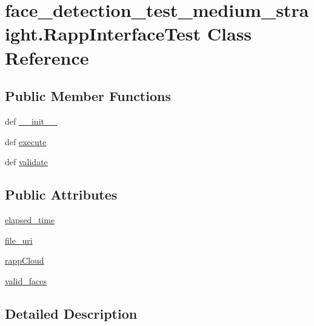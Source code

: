\hypertarget{classface__detection__test__medium__straight_1_1RappInterfaceTest}{\section{face\-\_\-detection\-\_\-test\-\_\-medium\-\_\-straight.\-Rapp\-Interface\-Test Class Reference}
\label{classface__detection__test__medium__straight_1_1RappInterfaceTest}
}
\subsection*{Public Member Functions}
\begin{DoxyCompactItemize}
\item 
def \hyperlink{classface__detection__test__medium__straight_1_1RappInterfaceTest_a1fd50662520a1155d022ab810a361b41}{\-\_\-\-\_\-init\-\_\-\-\_\-}
\item 
def \hyperlink{classface__detection__test__medium__straight_1_1RappInterfaceTest_a0dd7ef95d869635dc9815833be53f02b}{execute}
\item 
def \hyperlink{classface__detection__test__medium__straight_1_1RappInterfaceTest_ab895aebaf53763223674a1f03e357179}{validate}
\end{DoxyCompactItemize}
\subsection*{Public Attributes}
\begin{DoxyCompactItemize}
\item 
\hyperlink{classface__detection__test__medium__straight_1_1RappInterfaceTest_a1c19028329ec17f3cde63cf17a8d02f3}{elapsed\-\_\-time}
\item 
\hyperlink{classface__detection__test__medium__straight_1_1RappInterfaceTest_afcc408d7a366c6afca2f21f51674ff92}{file\-\_\-uri}
\item 
\hyperlink{classface__detection__test__medium__straight_1_1RappInterfaceTest_a2d21d428d9345e31dd64eaa8f2115781}{rapp\-Cloud}
\item 
\hyperlink{classface__detection__test__medium__straight_1_1RappInterfaceTest_a43b16f96ecb1d93c469b857dedcd0575}{valid\-\_\-faces}
\end{DoxyCompactItemize}


\subsection{Detailed Description}


